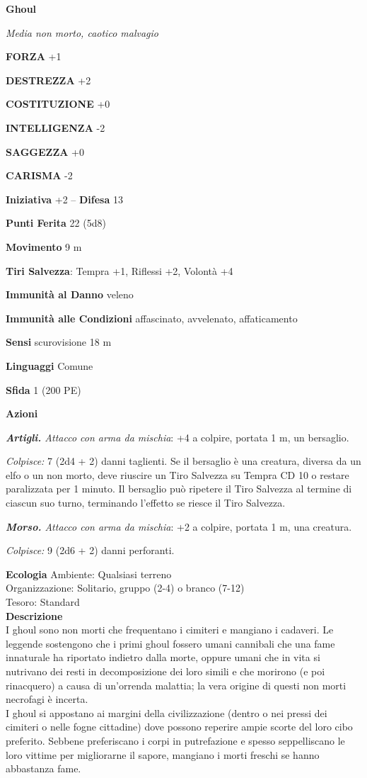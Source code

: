 \begin{multicols}{2}
\medskip{}\textbf{Ghoul}

\emph{Media non morto, caotico malvagio}

\textbf{FORZA} +1

\textbf{DESTREZZA} +2

\textbf{COSTITUZIONE} +0

\textbf{INTELLIGENZA} -2

\textbf{SAGGEZZA} +0

\textbf{CARISMA} -2

\textbf{Iniziativa} +2 -- \textbf{Difesa} 13

\textbf{Punti Ferita} 22 (5d8)

\textbf{Movimento} 9 m

\textbf{Tiri Salvezza}: Tempra +1, Riflessi +2, Volontà +4

\textbf{Immunità al Danno} veleno

\textbf{Immunità alle Condizioni} affascinato, avvelenato, affaticamento

\textbf{Sensi} scurovisione 18 m

\textbf{Linguaggi} Comune

\textbf{Sfida} 1 (200 PE)

\textbf{Azioni}

\emph{\textbf{Artigli.} Attacco con arma da mischia}: +4 a colpire, portata 1 m, un bersaglio.

\emph{Colpisce:} 7 (2d4 + 2) danni taglienti. Se il bersaglio è una creatura, diversa da un elfo o un non morto, deve riuscire un Tiro Salvezza su Tempra CD 10 o restare paralizzata per 1 minuto. Il bersaglio può ripetere il Tiro Salvezza al termine di ciascun suo turno, terminando l'effetto se riesce il Tiro Salvezza.

\emph{\textbf{Morso.} Attacco con arma da mischia}: +2 a colpire, portata 1 m, una creatura.

\emph{Colpisce:} 9 (2d6 + 2) danni perforanti.

\textbf{Ecologia}
Ambiente: Qualsiasi terreno\\
Organizzazione: Solitario, gruppo (2-4) o branco (7-12)\\
Tesoro: Standard\\
\textbf{Descrizione}\\
I ghoul sono non morti che frequentano i cimiteri e mangiano i cadaveri. Le leggende sostengono che i primi ghoul fossero umani cannibali che una fame innaturale ha riportato indietro dalla morte, oppure umani che in vita si nutrivano dei resti in decomposizione dei loro simili e che morirono (e poi rinacquero) a causa di un'orrenda malattia; la vera origine di questi non morti necrofagi è incerta.\\
I ghoul si appostano ai margini della civilizzazione (dentro o nei pressi dei cimiteri o nelle fogne cittadine) dove possono reperire ampie scorte del loro cibo preferito. Sebbene preferiscano i corpi in putrefazione e spesso seppelliscano le loro vittime per migliorarne il sapore, mangiano i morti freschi se hanno abbastanza fame.\\


\end{multicols}
